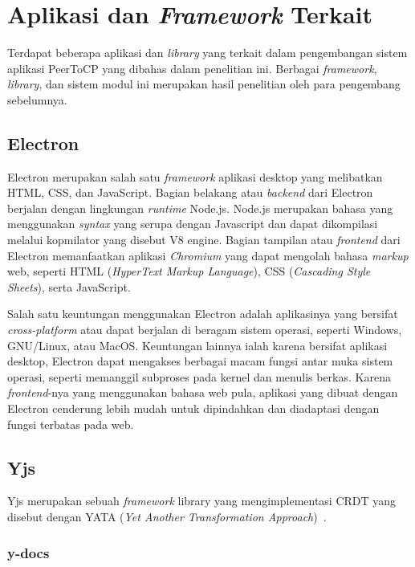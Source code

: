\section{Aplikasi dan \textit{Framework} Terkait}

Terdapat beberapa aplikasi dan \textit{library} yang terkait dalam pengembangan sistem aplikasi PeerToCP yang dibahas dalam penelitian ini. Berbagai \textit{framework}, \textit{library}, dan sistem modul ini merupakan hasil penelitian oleh para pengembang sebelumnya.

\subsection{Electron}

Electron merupakan salah satu \textit{framework} aplikasi desktop yang melibatkan HTML, CSS, dan JavaScript. Bagian belakang atau \textit{backend} dari Electron berjalan dengan lingkungan \textit{runtime} Node.js. Node.js merupakan bahasa yang menggunakan \textit{syntax} yang serupa dengan Javascript dan dapat dikompilasi melalui kopmilator yang disebut V8 engine. Bagian tampilan atau \textit{frontend} dari Electron memanfaatkan aplikasi \textit{Chromium} yang dapat mengolah bahasa \textit{markup} web, seperti HTML (\textit{HyperText Markup Language}), CSS (\textit{Cascading Style Sheets}), serta JavaScript.

Salah satu keuntungan menggunakan Electron adalah aplikasinya yang bersifat \textit{cross-platform} atau dapat berjalan di beragam sistem operasi, seperti Windows, GNU/Linux, atau MacOS. Keuntungan lainnya ialah karena bersifat aplikasi desktop, Electron dapat mengakses berbagai macam fungsi antar muka sistem operasi, seperti memanggil subproses pada kernel dan menulis berkas. Karena \textit{frontend}-nya yang menggunakan bahasa web pula, aplikasi yang dibuat dengan Electron cenderung lebih mudah untuk dipindahkan dan diadaptasi dengan fungsi terbatas pada web.

\subsection{Yjs}

Yjs merupakan sebuah \textit{framework} library yang mengimplementasi CRDT yang disebut dengan YATA (\textit{Yet Another Transformation Approach})~\citep{Nicolaescu2016yjs}.

\subsubsection{y-docs}

